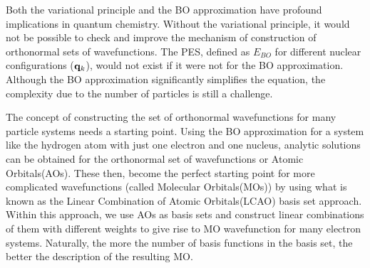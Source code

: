             Both the variational principle and the BO approximation have profound implications in quantum chemistry. Without the variational principle, it would not be possible to check and improve the mechanism of construction of orthonormal sets of wavefunctions. The PES, defined as $E_{BO}$ for different nuclear configurations (${\mathbf {q}}_k$), would not exist if it were not for the BO approximation. Although the BO approximation significantly simplifies the \Schrodinger{} equation, the complexity due to the number of particles is still a challenge.

            The concept of constructing the set of orthonormal wavefunctions for many particle systems needs a starting point. Using the BO approximation for a system like the hydrogen atom with just one electron and one nucleus, analytic solutions can be obtained for the orthonormal set of wavefunctions or Atomic Orbitals(AOs). These then, become the perfect starting point for more complicated wavefunctions (called Molecular Orbitals(MOs)) by using what is known as the Linear Combination of Atomic Orbitals(LCAO) basis set approach. Within this approach, we use AOs as basis sets and construct linear combinations of them with different weights to give rise to MO wavefunction for many electron systems. Naturally, the more the number of basis functions in the basis set, the better the description of the resulting MO.

